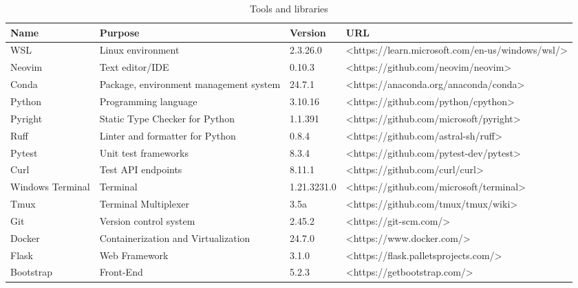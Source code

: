 \begin{sidewaystable}[htbp]
  \caption{Tools and libraries}\label{tab:tools}
  \raggedleft
  \begin{tabular}{|l|l|l|l|}
    \hline
    Name             & Purpose                                & Version     & URL                                              \\ \hline
    WSL              & Linux environment                      & 2.3.26.0    & <https://learn.microsoft.com/en-us/windows/wsl/> \\ \hline
    Neovim           & Text editor/IDE                        & 0.10.3      & <https://github.com/neovim/neovim>               \\ \hline
    Conda            & Package, environment management system & 24.7.1      & <https://anaconda.org/anaconda/conda>            \\ \hline
    Python           & Programming language                   & 3.10.16     & <https://github.com/python/cpython>              \\ \hline
    Pyright          & Static Type Checker for Python         & 1.1.391     & <https://github.com/microsoft/pyright>           \\ \hline
    Ruff             & Linter and formatter for Python        & 0.8.4       & <https://github.com/astral-sh/ruff>              \\ \hline
    Pytest           & Unit test frameworks                   & 8.3.4       & <https://github.com/pytest-dev/pytest>           \\ \hline
    Curl             & Test API endpoints                     & 8.11.1      & <https://github.com/curl/curl>                   \\ \hline
    Windows Terminal & Terminal                               & 1.21.3231.0 & <https://github.com/microsoft/terminal>          \\ \hline
    Tmux             & Terminal Multiplexer                   & 3.5a        & <https://github.com/tmux/tmux/wiki>              \\ \hline
    Git              & Version control system                 & 2.45.2      & <https://git-scm.com/>                           \\ \hline
    Docker           & Containerization and Virtualization    & 24.7.0      & <https://www.docker.com/>                        \\ \hline
    Flask            & Web Framework                          & 3.1.0       & <https://flask.palletsprojects.com/>             \\ \hline
    Bootstrap        & Front-End                              & 5.2.3       & <https://getbootstrap.com/>                      \\ \hline
  \end{tabular}
\end{sidewaystable}

